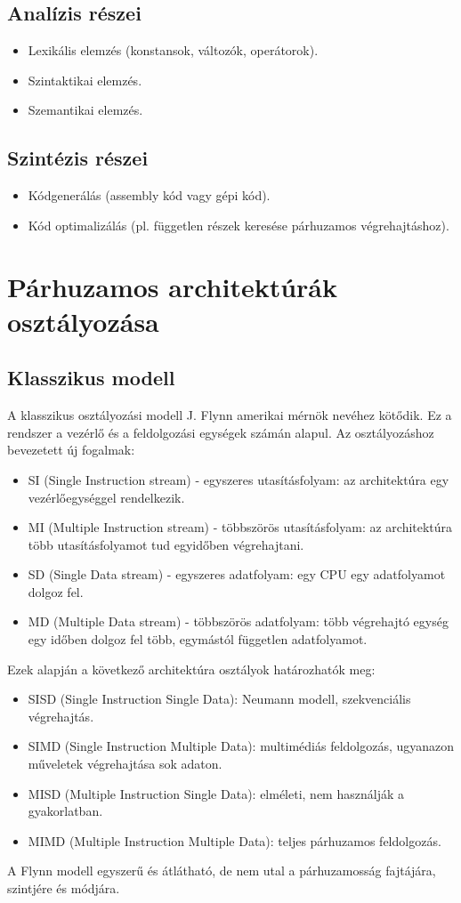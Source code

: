 \subsection{Analízis részei}
\begin{itemize}
    \item Lexikális elemzés (konstansok, változók, operátorok).
    \item Szintaktikai elemzés.
    \item Szemantikai elemzés.
\end{itemize}
\subsection{Szintézis részei}
\begin{itemize}
    \item Kódgenerálás (assembly kód vagy gépi kód).
    \item Kód optimalizálás (pl. független részek keresése párhuzamos végrehajtáshoz).
\end{itemize}

\section{Párhuzamos architektúrák osztályozása}
\subsection{Klasszikus modell}
A klasszikus osztályozási modell J. Flynn amerikai mérnök nevéhez kötődik.
Ez a rendszer a vezérlő és a feldolgozási egységek számán alapul.
Az osztályozáshoz bevezetett új fogalmak:
\begin{itemize}
    \item SI (Single Instruction stream) - egyszeres utasításfolyam: az architektúra egy vezérlőegységgel rendelkezik.
    \item MI (Multiple Instruction stream) - többszörös utasításfolyam: az architektúra több utasításfolyamot tud egyidőben végrehajtani.
    \item SD (Single Data stream) - egyszeres adatfolyam: egy CPU egy adatfolyamot dolgoz fel.
    \item MD (Multiple Data stream) - többszörös adatfolyam: több végrehajtó egység egy időben dolgoz fel több, egymástól független adatfolyamot.
\end{itemize}
Ezek alapján a következő architektúra osztályok határozhatók meg:
\begin{itemize}
    \item SISD (Single Instruction Single Data): Neumann modell, szekvenciális végrehajtás.
    \item SIMD (Single Instruction Multiple Data): multimédiás feldolgozás, ugyanazon műveletek végrehajtása sok adaton.
    \item MISD (Multiple Instruction Single Data): elméleti, nem használják a gyakorlatban.
    \item MIMD (Multiple Instruction Multiple Data): teljes párhuzamos feldolgozás.
\end{itemize}
A Flynn modell egyszerű és átlátható, de nem utal a párhuzamosság fajtájára, szintjére és módjára.


